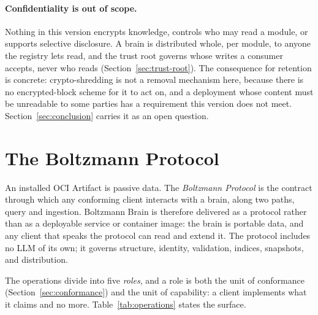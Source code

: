 \documentclass[11pt,a4paper]{article}
\begin{document}
\paragraph{Confidentiality is out of scope.}
\label{sec:no-confidentiality}
Nothing in this version encrypts knowledge, controls who may read a module,
or supports selective disclosure. A brain is distributed whole, per module,
to anyone the registry lets read, and the trust root governs whose writes a
consumer accepts, never who reads (Section~\ref{sec:trust-root}). The
consequence for retention is concrete: crypto-shredding is not a removal
mechanism here, because there is no encrypted-block scheme for it to act on,
and a deployment whose content must be unreadable to some parties has a
requirement this version does not meet. Section~\ref{sec:conclusion} carries
it as an open question.

\section{The Boltzmann Protocol}
\label{sec:protocol}

An installed OCI Artifact is passive data. The \emph{Boltzmann Protocol} is the
contract through which any conforming client interacts with a brain, along two
paths, query and ingestion. Boltzmann Brain is therefore delivered as a
protocol rather than as a deployable service or container image: the brain is
portable data, and any client that speaks the protocol can read and extend it.
The protocol includes no LLM of its own; it governs structure, identity,
validation, indices, snapshots, and distribution.

The operations divide into five \emph{roles}, and a role is both the unit of
conformance (Section~\ref{sec:conformance}) and the unit of capability: a
client implements what it claims and no more. Table~\ref{tab:operations}
states the surface.
\end{document}
